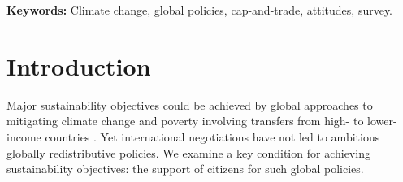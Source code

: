 \textbf{Keywords:} Climate change, global policies, cap-and-trade, attitudes, survey.%

\tableofcontents

\onehalfspacing %


\section{Introduction}%


Major sustainability objectives could be achieved by global approaches to mitigating climate change and poverty involving transfers from high- to lower-income countries \citep{budolfson_climate_2021,franks_mobilizing_2018,dennig_inequality_2015,soergel_combining_2021,bauer_quantification_2020,cramton_global_2017}. 
Yet international negotiations have not led to ambitious globally redistributive policies. 
We examine a key condition for achieving sustainability objectives: the support of citizens for such global policies. %

